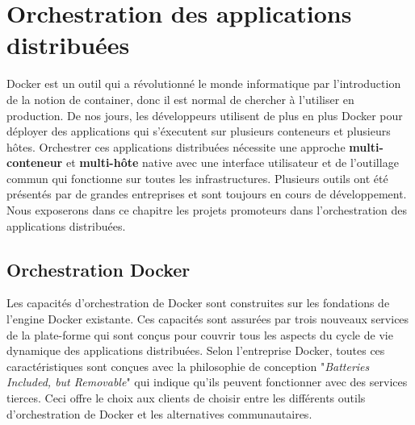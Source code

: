 \chapter{Orchestration des applications distribuées}
\begin{onehalfspace}
Docker est un outil qui a révolutionné le monde informatique par l'introduction de la notion de container, donc il est normal de chercher  à l'utiliser en production. De nos jours, les développeurs utilisent de plus en plus Docker pour déployer des applications qui s'éxecutent sur plusieurs conteneurs et plusieurs hôtes. Orchestrer ces applications distribuées nécessite une approche \textbf{multi-conteneur} et \textbf{multi-hôte} native avec une interface utilisateur et de l'outillage commun qui fonctionne sur toutes les infrastructures. Plusieurs outils ont été présentés par de grandes entreprises et sont toujours en cours de développement. Nous exposerons dans ce chapitre les projets promoteurs dans l'orchestration des applications distribuées.
\section{Orchestration Docker}
Les capacités d'orchestration de Docker sont construites sur les fondations de l'engine Docker existante. Ces capacités sont assurées par trois nouveaux services de la plate-forme qui sont conçus pour couvrir tous les aspects du cycle de vie dynamique des applications distribuées. Selon l'entreprise Docker, toutes ces caractéristiques sont conçues avec la philosophie de conception "\emph{Batteries Included, but Removable}" qui indique qu'ils peuvent fonctionner avec des services tierces. Ceci offre le choix aux clients de choisir entre les différents outils d'orchestration de Docker et les alternatives communautaires.

\end{onehalfspace}
